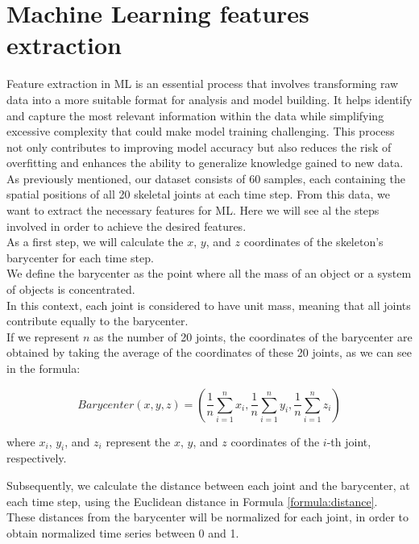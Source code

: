\section{Machine Learning features extraction}
Feature extraction in ML is an essential process that involves transforming raw data into a more suitable format for analysis and model building.
It helps identify and capture the most relevant information within the data while simplifying excessive complexity that could make model training challenging.
This process not only contributes to improving model accuracy but also reduces the risk of overfitting and enhances the ability to generalize knowledge gained to new data. \\
As previously mentioned, our dataset consists of 60 samples, each containing the spatial positions of all 20 skeletal joints at each time step.
From this data, we want to extract the necessary features for ML.
Here we will see al the steps involved in order to achieve the desired features. \\

As a first step, we will calculate the $x$, $y$, and $z$ coordinates of the skeleton's barycenter for each time step. \\
We define the barycenter as the point where all the mass of an object or a system of objects is concentrated. \\
In this context, each joint is considered to have unit mass, meaning that all joints contribute equally to the barycenter. \\
If we represent $n$ as the number of 20 joints, the coordinates of the barycenter are obtained by taking the average of the coordinates of these 20 joints, as we can see in the formula:


\begin{equation}
    \textit{Barycenter} (x, y, z) = \left(\frac{1}{n} \sum_{i=1}^{n} x_i, \frac{1}{n} \sum_{i=1}^{n} y_i, \frac{1}{n} \sum_{i=1}^{n} z_i\right)
    \label{formula:baricentro}
\end{equation}
    
where $x_i$, $y_i$, and $z_i$ represent the $x$, $y$, and $z$ coordinates of the $i$-th joint, respectively.

Subsequently, we calculate the distance between each joint and the barycenter, at each time step, using the Euclidean distance in Formula \ref{formula:distance}. \\
These distances from the barycenter will be normalized for each joint, in order to obtain normalized time series between 0 and 1.

